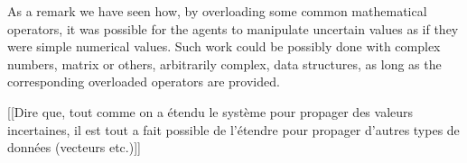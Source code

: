 As a remark we have seen how, by overloading some common mathematical operators, it was possible for the agents to manipulate uncertain values as if they were simple numerical values. Such work could be possibly done with complex numbers, matrix or others, arbitrarily complex, data structures, as long as the corresponding overloaded operators are provided.

[[Dire que, tout comme on a étendu le système pour propager des valeurs incertaines, il est tout a fait possible de l'étendre pour propager d'autres types de données (vecteurs etc.)]]